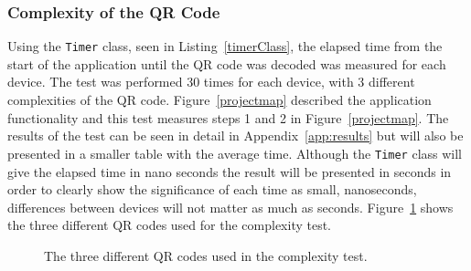 %       
%		

\subsubsection{Complexity of the QR Code}

Using the \texttt{Timer} class, seen in Listing~\ref{timerClass}, the elapsed time from the start of the application until the QR code was decoded was measured for each device. The test was performed 30 times for each device, with 3 different complexities of the QR code. Figure~\ref{projectmap} described the application functionality and this test measures steps 1 and 2 in Figure~\ref{projectmap}. The results of the test can be seen in detail in Appendix~\ref{app:results} but will also be presented in a smaller table with the average time.
Although the \texttt{Timer} class will give the elapsed time in nano seconds the result will be presented in seconds in order to clearly show the significance of each time as small, nanoseconds, differences between devices will not matter as much as seconds. Figure~\ref{qrCodeComplex} shows the three different QR codes used for the complexity test.

	\begin{figure}[H]%
		\centering
   		 \qquad
   		 \qquad
   		 \qquad
		\caption{The three different QR codes used in the complexity test.}
		\label{qrCodeComplex}
	\end{figure}

